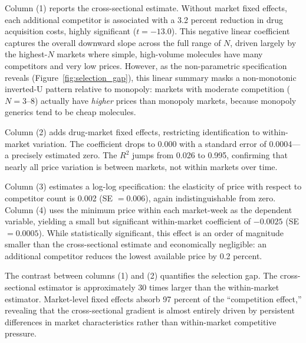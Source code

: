 \documentclass[12pt]{article}
\begin{document}
Column (1) reports the cross-sectional estimate. Without market fixed effects, each additional competitor is associated with a 3.2 percent reduction in drug acquisition costs, highly significant ($t = -13.0$). This negative linear coefficient captures the overall downward slope across the full range of $N$, driven largely by the highest-$N$ markets where simple, high-volume molecules have many competitors and very low prices. However, as the non-parametric specification reveals (Figure~\ref{fig:selection_gap}), this linear summary masks a non-monotonic inverted-U pattern relative to monopoly: markets with moderate competition ($N = 3$--$8$) actually have \emph{higher} prices than monopoly markets, because monopoly generics tend to be cheap molecules.

Column (2) adds drug-market fixed effects, restricting identification to within-market variation. The coefficient drops to 0.000 with a standard error of 0.0004---a precisely estimated zero. The $R^2$ jumps from 0.026 to 0.995, confirming that nearly all price variation is between markets, not within markets over time.

Column (3) estimates a log-log specification: the elasticity of price with respect to competitor count is 0.002 (SE $= 0.006$), again indistinguishable from zero. Column (4) uses the minimum price within each market-week as the dependent variable, yielding a small but significant within-market coefficient of $-0.0025$ (SE $= 0.0005$). While statistically significant, this effect is an order of magnitude smaller than the cross-sectional estimate and economically negligible: an additional competitor reduces the lowest available price by 0.2 percent.

The contrast between columns (1) and (2) quantifies the selection gap. The cross-sectional estimator is approximately 30 times larger than the within-market estimator. Market-level fixed effects absorb 97 percent of the ``competition effect,'' revealing that the cross-sectional gradient is almost entirely driven by persistent differences in market characteristics rather than within-market competitive pressure.
\end{document}
